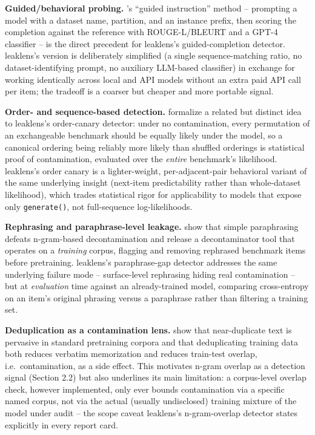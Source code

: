 \documentclass[11pt]{article}
\begin{document}
\textbf{Guided/behavioral probing.} \citet{golchin2023timetravel}'s
``guided instruction'' method -- prompting a model with a dataset name,
partition, and an instance prefix, then scoring the completion against
the reference with ROUGE-L/BLEURT and a GPT-4 classifier -- is the direct
precedent for leaklens's guided-completion detector. leaklens's version
is deliberately simplified (a single sequence-matching ratio, no
dataset-identifying prompt, no auxiliary LLM-based classifier) in
exchange for working identically across local and API models without an
extra paid API call per item; the tradeoff is a coarser but
cheaper and more portable signal.

\textbf{Order- and sequence-based detection.} \citet{oren2023proving}
formalize a related but distinct idea to leaklens's order-canary
detector: under no contamination, every permutation of an exchangeable
benchmark should be equally likely under the model, so a canonical
ordering being reliably more likely than shuffled orderings is
statistical proof of contamination, evaluated over the \emph{entire}
benchmark's likelihood. leaklens's order canary is a lighter-weight,
per-adjacent-pair behavioral variant of the same underlying insight
(next-item predictability rather than whole-dataset likelihood), which
trades statistical rigor for applicability to models that expose only
\texttt{generate()}, not full-sequence log-likelihoods.

\textbf{Rephrasing and paraphrase-level leakage.} \citet{yang2023rethinking}
show that simple paraphrasing defeats n-gram-based decontamination and
release a decontaminator tool that operates on a \emph{training} corpus,
flagging and removing rephrased benchmark items before pretraining.
leaklens's paraphrase-gap detector addresses the same underlying failure
mode -- surface-level rephrasing hiding real contamination -- but at
\emph{evaluation} time against an already-trained model, comparing
cross-entropy on an item's original phrasing versus a paraphrase rather
than filtering a training set.

\textbf{Deduplication as a contamination lens.} \citet{lee2021deduplicating}
show that near-duplicate text is pervasive in standard pretraining
corpora and that deduplicating training data both reduces verbatim
memorization and reduces train-test overlap, i.e.\ contamination, as a
side effect. This motivates n-gram overlap as a detection signal
(Section 2.2) but also underlines its main limitation: a corpus-level
overlap check, however implemented, only ever bounds contamination via a
specific named corpus, not via the actual (usually undisclosed) training
mixture of the model under audit -- the scope caveat leaklens's
n-gram-overlap detector states explicitly in every report card.
\end{document}
